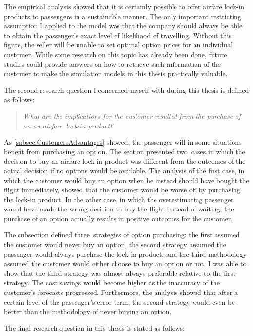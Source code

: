 The empirical analysis showed that it is certainly possible to offer airfare lock-in products to passengers in a sustainable manner. The only important restricting assumption I applied to the model was that the company should always be able to obtain the passenger's exact level of likelihood of travelling. Without this figure, the seller will be unable to set optimal option prices for an individual customer. While some research on this topic has already been done, future studies could provide answers on how to retrieve such information of the customer to make the simulation models in this thesis practically valuable.

The second research question I concerned myself with during this thesis is defined as follows:

\begin{quote}\emph{What are the implications for the customer resulted from the purchase of an an airfare~lock-in product?}\end{quote}

As \autoref{subsec:CustomersAdvantages} showed, the passenger will in some situations benefit from purchasing an option. The section presented two~cases in which the decision to buy an airfare lock-in product was different from the outcomes of the actual decision if no options would be available. The analysis of the first case, in which the customer would buy an option when he instead should have bought the flight immediately, showed that the customer would be worse off by purchasing the lock-in product. In the other case, in which the overestimating passenger would have made the wrong decision to buy the flight instead of waiting, the purchase of an option actually results in positive outcomes for the customer.

The subsection defined three~strategies of option purchasing: the first assumed the customer would never buy an option, the second strategy assumed the passenger would always purchase the lock-in product, and the third methodology assumed the customer would either choose to buy an option or not. I was able to show that the third strategy was almost always preferable relative to the first strategy. The cost savings would become higher as the inaccuracy of the customer's forecasts progressed. Furthermore, the analysis showed that after a certain level of the passenger's error term, the second strategy would even be better than the methodology of never buying an option.

The final research question in this thesis is stated as follows:

